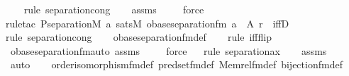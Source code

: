 \begin{isabellebody}
\ \ \ \isamarkupfalse%
{\isacharparenleft}{\kern0pt}rule\ separation{\isacharunderscore}{\kern0pt}cong{\isacharparenright}{\kern0pt}\isanewline
\ \ \isamarkupfalse%
\ assms\isanewline
\ \ \ \isamarkupfalse%
\ force\isanewline
\ \ \isamarkupfalse%
{\isacharparenleft}{\kern0pt}rule{\isacharunderscore}{\kern0pt}tac\ P{\isacharequal}{\kern0pt}{\isachardoublequoteopen}separation{\isacharparenleft}{\kern0pt}{\isacharhash}{\kern0pt}{\isacharhash}{\kern0pt}M{\isacharcomma}{\kern0pt}\ {\isasymlambda}a{\isachardot}{\kern0pt}\ sats{\isacharparenleft}{\kern0pt}M{\isacharcomma}{\kern0pt}\ obase{\isacharunderscore}{\kern0pt}separation{\isacharunderscore}{\kern0pt}fm{\isacharcomma}{\kern0pt}\ {\isacharbrackleft}{\kern0pt}a{\isacharbrackright}{\kern0pt}\ {\isacharat}{\kern0pt}\ {\isacharbrackleft}{\kern0pt}A{\isacharcomma}{\kern0pt}\ r{\isacharbrackright}{\kern0pt}{\isacharparenright}{\kern0pt}{\isacharparenright}{\kern0pt}{\isachardoublequoteclose}\ \ iffD{}{\isacharparenright}{\kern0pt}\isanewline
\ \ \isamarkupfalse%
{\isacharparenleft}{\kern0pt}rule\ separation{\isacharunderscore}{\kern0pt}cong{\isacharparenright}{\kern0pt}\isanewline
\ \ \isamarkupfalse%
\ obase{\isacharunderscore}{\kern0pt}separation{\isacharunderscore}{\kern0pt}fm{\isacharunderscore}{\kern0pt}def\isanewline
\ \ \ \isamarkupfalse%
{\isacharparenleft}{\kern0pt}rule\ iff{\isacharunderscore}{\kern0pt}flip{\isacharparenright}{\kern0pt}\isanewline
\ \ \isamarkupfalse%
\ obase{\isacharunderscore}{\kern0pt}separation{\isacharunderscore}{\kern0pt}fm{\isacharunderscore}{\kern0pt}auto\ assms\isanewline
\ \ \ \isamarkupfalse%
\ force\isanewline
\ \ \isamarkupfalse%
{\isacharparenleft}{\kern0pt}rule\ separation{\isacharunderscore}{\kern0pt}ax{\isacharparenright}{\kern0pt}\isanewline
\ \ \isamarkupfalse%
\ assms\isanewline
\ \ \ \ \isamarkupfalse%
\ auto{\isacharbrackleft}{\kern0pt}{}{\isacharbrackright}{\kern0pt}\isanewline
\ \ \isamarkupfalse%
\ order{\isacharunderscore}{\kern0pt}isomorphism{\isacharunderscore}{\kern0pt}fm{\isacharunderscore}{\kern0pt}def\ pred{\isacharunderscore}{\kern0pt}set{\isacharunderscore}{\kern0pt}fm{\isacharunderscore}{\kern0pt}def\ Memrel{\isacharunderscore}{\kern0pt}fm{\isacharunderscore}{\kern0pt}def\ bijection{\isacharunderscore}{\kern0pt}fm{\isacharunderscore}{\kern0pt}def\isanewline
\ \ \isamarkupfalse%

\end{isabellebody}
